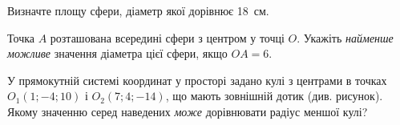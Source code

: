 \documentclass[12pt]{article}
\begin{document}
\begin{samepage}
\noindent\zadnum Визначте площу сфери, діаметр якої дорівнює 18~см. 

\nmtnobreak
\nopagebreak\nbvspace{0.3cm}

\nmtnobreak
\nopagebreak\nbvspace{0.5cm}
\par{}\vspace{0.25cm}
\end{samepage}

\begin{samepage}
\noindent\zadnum Точка $A$ розташована всередині сфери з центром у точці $O$. Укажіть \textit{найменше можливе} значення діаметра цієї сфери, якщо $OA=6$. 

\nmtnobreak
\nopagebreak\nbvspace{0.3cm}

\nmtnobreak
\nopagebreak\nbvspace{0.5cm}
\par{}\vspace{0.25cm}
\end{samepage}

\begin{samepage}
\noindent
\begin{minipage}[c]{0.56\textwidth}
\zadnum У прямокутній системі координат у просторі задано кулі з центрами в точках $O_1(1; -4; 10)$ і $O_2(7; 4; -14)$, що мають зовнішній дотик (див. рисунок). Якому значенню серед наведених \textit{може} дорівнювати радіус меншої кулі? 
\end{minipage}%
\hfill
\begin{minipage}[c]{0.40\textwidth}
\centering
\begin{nmtfit}\end{nmtfit}
\end{minipage}
\par\nbvspace{0.2cm}

\nopagebreak\nbvspace{-0.3cm}

\nmtnobreak
\nopagebreak\nbvspace{0.5cm}
\par{}\vspace{0.25cm}
\end{samepage}
\end{document}
